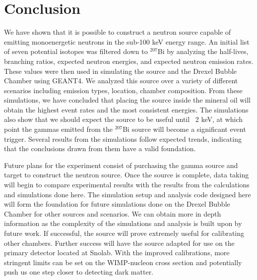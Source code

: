 \documentclass[%
12pt,
twoside,
reprint,
amsmath,amssymb,
aps,
]{article}
\begin{document}
	\section{Conclusion}
	\par We have shown that it is possible to construct a neutron source capable of emitting monoenergetic neutrons in the sub-100 keV energy range. An initial list of seven potential isotopes was filtered down to $^{207}$Bi by analyzing the half-lives, branching ratios, expected neutron energies, and expected neutron emission rates. These values were then used in simulating the source and the Drexel Bubble Chamber using GEANT4. We analyzed this source over a variety of different scenarios including emission types, location, chamber composition. From these simulations, we have concluded that placing the source inside the mineral oil will obtain the highest event rates and the most consistent energies. The simulations also show that we should expect the source to be useful until ~2 keV, at which point the gammas emitted from the $^{207}$Bi source will become a significant event trigger. Several results from the simulations follow expected trends, indicating that the conclusions drawn from them have a valid foundation.
	\par Future plans for the experiment consist of purchasing the gamma source and target to construct the neutron source. Once the source is complete, data taking will begin to compare experimental results with the results from the calculations and simulations done here. The simulation setup and analysis code designed here will form the foundation for future simulations done on the Drexel Bubble Chamber for other sources and scenarios. We can obtain more in depth information as the complexity of the simulations and analysis is built upon by future work. If successful, the source will prove extremely useful for calibrating other chambers. Further success will have the source adapted for use on the primary detector located at Snolab. With the improved calibrations, more stringent limits can be set on the WIMP-nucleon cross section and potentially push us one step closer to detecting dark matter.
	
\end{document}
